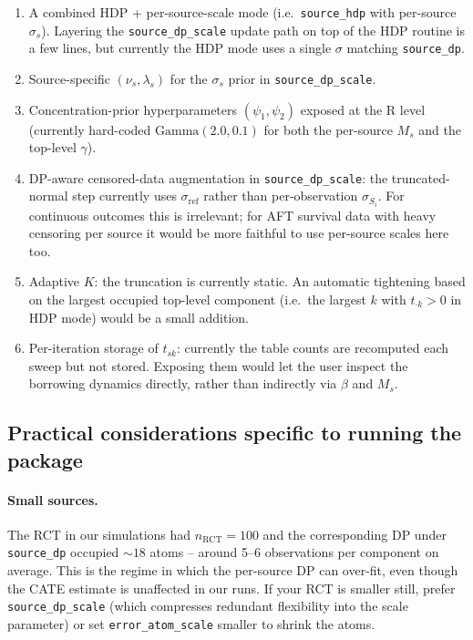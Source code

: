 \documentclass[11pt]{article}
\theoremstyle{plain}
\theoremstyle{definition}
\theoremstyle{remark}
\newcommand{\1}{\mathds{1}}
\begin{document}
\begin{enumerate}[noitemsep]
  \item A combined HDP + per-source-scale mode (i.e.\ \texttt{source\_hdp} with per-source $\sigma_s$). Layering the \texttt{source\_dp\_scale} update path on top of the HDP routine is a few lines, but currently the HDP mode uses a single $\sigma$ matching \texttt{source\_dp}.
  \item Source-specific $(\nu_s, \lambda_s)$ for the $\sigma_s$ prior in \texttt{source\_dp\_scale}.
  \item Concentration-prior hyperparameters $(\psi_1, \psi_2)$ exposed at the R level (currently hard-coded $\mathrm{Gamma}(2.0, 0.1)$ for both the per-source $M_s$ and the top-level $\gamma$).
  \item DP-aware censored-data augmentation in \texttt{source\_dp\_scale}: the truncated-normal step currently uses $\sigma_\mathrm{ref}$ rather than per-observation $\sigma_{S_i}$. For continuous outcomes this is irrelevant; for AFT survival data with heavy censoring per source it would be more faithful to use per-source scales here too.
  \item Adaptive $K$: the truncation is currently static. An automatic tightening based on the largest occupied top-level component (i.e.\ the largest $k$ with $t_{\cdot k} > 0$ in HDP mode) would be a small addition.
  \item Per-iteration storage of $t_{sk}$: currently the table counts are recomputed each sweep but not stored. Exposing them would let the user inspect the borrowing dynamics directly, rather than indirectly via $\beta$ and $M_s$.
\end{enumerate}

\subsection{Practical considerations specific to running the package}

\paragraph{Small sources.} The RCT in our simulations had $n_\mathrm{RCT} = 100$ and the corresponding DP under \texttt{source\_dp} occupied $\sim 18$ atoms -- around 5--6 observations per component on average. This is the regime in which the per-source DP can over-fit, even though the CATE estimate is unaffected in our runs. If your RCT is smaller still, prefer \texttt{source\_dp\_scale} (which compresses redundant flexibility into the scale parameter) or set \texttt{error\_atom\_scale} smaller to shrink the atoms.
\end{document}
